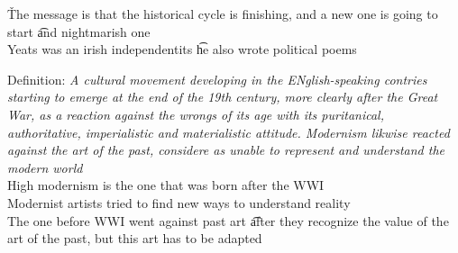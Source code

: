 \documentclass[12pt]{article}
\begin{document}
\v

The message is that the historical cycle is finishing, and a new one is going to start \t and nightmarish one \\
Yeats was an irish independentits \t he also wrote political poems

Definition: \textit{A cultural movement developing in the ENglish-speaking contries starting to emerge at the end of the 19th century, more clearly after the Great War, as a reaction against the wrongs of its age with its puritanical, authoritative, imperialistic and materialistic attitude. Modernism likwise reacted against the art of the past, considere as unable to represent and understand the modern world} \\
High modernism is the one that was born after the WWI \\
Modernist artists tried to find new ways to understand reality \\
The one before WWI went against past art \t after they recognize the value of the art of the past, but this art has to be adapted
\end{document}
